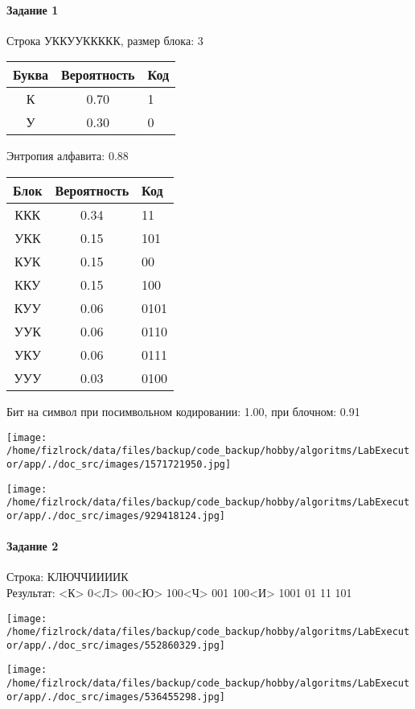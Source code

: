 \documentclass[a4paper, 12pt]{article}
\begin{document}
\paragraph{Задание 1}

Строка УККУУККККК, размер блока: 3
\begin{center}
 \begin{tabular}{ |c|c|l| } 
  \hline
     Буква & Вероятность & Код\\ \hline
К & 0.70 & 1\\\hline
У & 0.30 & 0
\\ \hline \end{tabular}
\end{center}
Энтропия алфавита: 0.88
\begin{center}
 \begin{tabular}{ |c|c|l| } 
  \hline
     Блок & Вероятность & Код\\ \hline
ККК & 0.34 & 11\\\hline
УКК & 0.15 & 101\\\hline
КУК & 0.15 & 00\\\hline
ККУ & 0.15 & 100\\\hline
КУУ & 0.06 & 0101\\\hline
УУК & 0.06 & 0110\\\hline
УКУ & 0.06 & 0111\\\hline
УУУ & 0.03 & 0100
\\ \hline \end{tabular}
\end{center}
Бит на символ при посимвольном кодировании: 1.00, при блочном: 0.91

\texttt{[image: /home/fizlrock/data/files/backup/code\_backup/hobby/algoritms/LabExecutor/app/./doc\_src/images/1571721950.jpg]}

\texttt{[image: /home/fizlrock/data/files/backup/code\_backup/hobby/algoritms/LabExecutor/app/./doc\_src/images/929418124.jpg]}
\pagebreak
\paragraph{Задание 2}

Строка: 
КЛЮЧЧИИИИК\\
Результат: <К> 0<Л> 00<Ю> 100<Ч> 001 100<И> 1001 01 11 101

\texttt{[image: /home/fizlrock/data/files/backup/code\_backup/hobby/algoritms/LabExecutor/app/./doc\_src/images/552860329.jpg]}

\texttt{[image: /home/fizlrock/data/files/backup/code\_backup/hobby/algoritms/LabExecutor/app/./doc\_src/images/536455298.jpg]}
\end{document}
